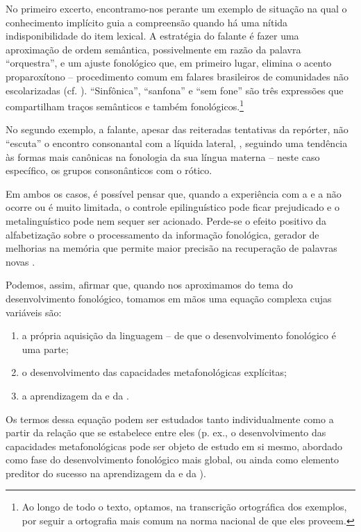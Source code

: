 \documentclass[output=paper]{LSP/langsci}
\begin{document}
No primeiro excerto, encontramo-nos perante um exemplo de situação na qual o conhecimento implícito guia a compreensão quando há uma nítida indisponibilidade do item lexical. A estratégia do falante é fazer uma aproximação de ordem semântica, possivelmente em razão da palavra ``orquestra'', e um ajuste fonológico que, em primeiro lugar, elimina o acento proparoxítono -- procedimento comum em falares brasileiros de comunidades não escolarizadas (cf. \citealt{amaral2000}). ``Sinfônica'', ``sanfona'' e ``sem fone'' são três expressões que compartilham traços semânticos e também fonológicos.\footnote{Ao longo de todo o texto, optamos, na transcrição ortográfica dos exemplos, por seguir a ortografia mais comum na norma nacional de que eles proveem.}

No segundo exemplo, a falante, apesar das reiteradas tentativas da repórter, não “escuta” o encontro consonantal com a líquida lateral, , seguindo uma tendência às formas mais canônicas na fonologia da sua língua materna -- neste caso específico, os grupos consonânticos com o rótico.

Em ambos os casos, é possível pensar que, quando a experiência com a  e a  não ocorre ou é muito limitada, o controle epilinguístico pode ficar prejudicado e o metalinguístico pode nem sequer ser acionado. Perde-se o efeito positivo da alfabetização sobre o processamento da informação fonológica, gerador de melhorias na memória que permite maior precisão na recuperação de palavras novas \citep{goswamibryant1990}.

Podemos, assim, afirmar que, quando nos aproximamos do tema do desenvolvimento fonológico, tomamos em mãos uma equação complexa cujas variáveis são:

\begin{enumerate}[label=(\roman*)]
\item a própria aquisição da linguagem -- de que o desenvolvimento fonológico é uma parte;

\item o desenvolvimento das capacidades metafonológicas explícitas;
\item a aprendizagem da  e da .
\end{enumerate}

Os termos dessa equação podem ser estudados tanto individualmente como a partir da relação que se estabelece entre eles (p. ex., o desenvolvimento das capacidades metafonológicas pode ser objeto de estudo em si mesmo, abordado como fase do desenvolvimento fonológico mais global, ou ainda como elemento preditor do sucesso na aprendizagem da  e da ).
\end{document}
